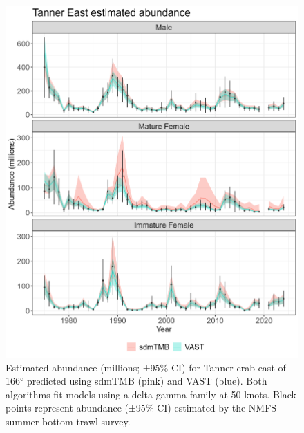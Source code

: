 \documentclass[
]{article}
\begin{document}
\begin{figure}

{\centering \includegraphics[width=1\linewidth,height=1\textheight]{../BAIRDI/Figures/TannerE.abundance.sdmTMBVASTindex} 

}

\caption{Estimated abundance (millions; ±95\% CI) for Tanner crab east of 166° predicted using sdmTMB (pink) and VAST (blue). Both algorithms fit models using a delta-gamma family at 50 knots. Black points represent abundance (±95\% CI) estimated by the NMFS summer bottom trawl survey.}\label{fig:Eastbairdi-abund-compare}
\end{figure}
\end{document}
